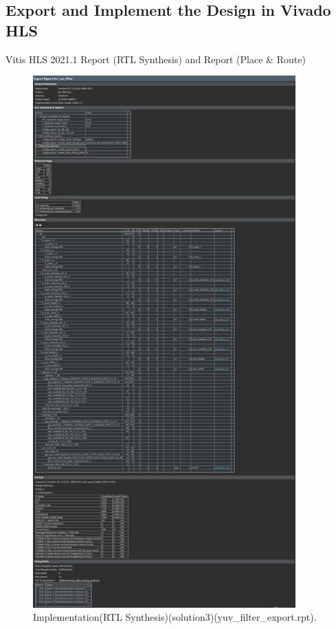 \documentclass[a4paper]{article}
\begin{document}
\subsection{Export and Implement the Design in Vivado HLS}
Vitis HLS 2021.1 Report (RTL Synthesis) and Report (Place \& Route)
\begin{figure}[H]
    \centering
    \includegraphics[width=0.9\textwidth]{8.png}
    \caption{Implementation(RTL Synthesis)(solution3)(yuv\_filter\_export.rpt).}
\end{figure}
\end{document}
